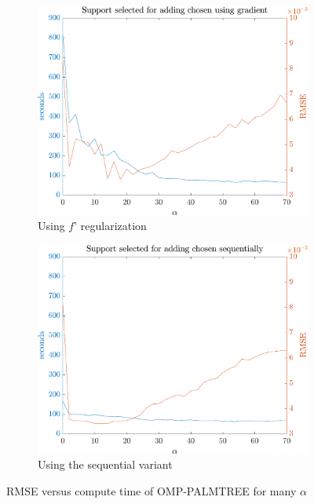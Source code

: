\begin{figure}[!h] \centering
\begin{subfigure}[b]{0.49\textwidth}\centering
\includegraphics[width=\textwidth]{figures/tree-learn/gradient-vs-sequential/gradient_used.pdf}
	\caption{Using $f’$ regularization}\label{fig_cmp_rmse_vs_time_grad}
\end{subfigure}
\begin{subfigure}[b]{0.49\textwidth}\centering
\includegraphics[width=\textwidth]{figures/tree-learn/gradient-vs-sequential/gradient_not_used.pdf} 
	\caption{Using the sequential variant}\label{fig_cmp_rmse_vs_time_seq}
\end{subfigure}	
\caption{RMSE versus compute time of OMP-PALMTREE for many $\alpha$}\label{fig_cmp_rmse_vs_time}
\end{figure}
\FloatBarrier

